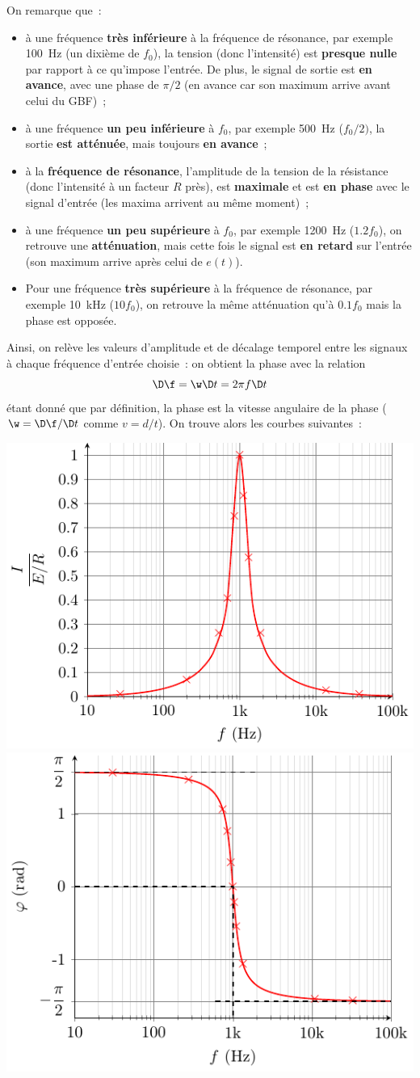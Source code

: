 \documentclass[../main/main.tex]{subfiles}
\begin{document}
{	On remarque que~:
	\begin{itemize}
		\item à une fréquence \textbf{très inférieure} à la fréquence de résonance,
		      par exemple \SI{100}{Hz} (un dixième de $f_0$), la tension (donc
		      l'intensité) est \textbf{presque nulle} par rapport à ce qu'impose
		      l'entrée. De plus, le signal de sortie est \textbf{en avance}, avec
		      une phase de $\pi/2$ (en avance car son maximum arrive avant celui du
		      GBF)~;
		\item à une fréquence \textbf{un peu inférieure} à $f_0$, par exemple
		      \SI{500}{Hz} ($f_0/2)$, la sortie \textbf{est atténuée}, mais toujours
		      \textbf{en avance}~;
		\item à la \textbf{fréquence de résonance}, l'amplitude de la tension de la
		      résistance (donc l'intensité à un facteur $R$ près), est
		      \textbf{maximale} et est \textbf{en phase} avec le signal d'entrée (les
		      maxima arrivent au même moment)~;
		\item à une fréquence \textbf{un peu supérieure} à $f_0$, par exemple
		      \SI{1200}{Hz} ($\num{1.2}f_0$), on retrouve une \textbf{atténuation},
		      mais cette fois le signal est \textbf{en retard} sur l'entrée (son
		      maximum arrive après celui de $e(t)$).
		\item Pour une fréquence \textbf{très supérieure} à la fréquence de
		      résonance, par exemple \SI{10}{kHz} ($10f_0$), on retrouve la même
		      atténuation qu'à $\num{0.1}f_0$ mais la phase est opposée.
	\end{itemize}
	Ainsi, on relève les valeurs d'amplitude et de décalage temporel entre
	les signaux à chaque fréquence d'entrée choisie~: on obtient la phase
	avec la relation
	\[\D\f = \w\D t =2\pi f\D t\]
	étant donné que par définition, la phase est la vitesse angulaire de la
	phase ($\w = \D\f/\D t$ comme $v = d/t$). On trouve alors les courbes
	suivantes~:
	\begin{center}
		\includegraphics[width=.49\linewidth]{RLCR_amplitude}
		\hfill
		\includegraphics[width=.49\linewidth]{RLCR_phase}
	\end{center}
}
\end{document}
